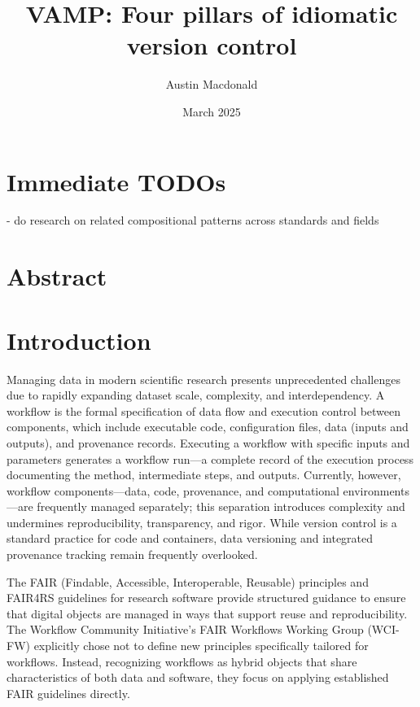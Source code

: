 \documentclass{article}
\title{VAMP: Four pillars of idiomatic version control}
\author{Austin Macdonald}
\date{March 2025}
\begin{document}
\maketitle

\section{Immediate TODOs}

- do research on related compositional patterns across standards and fields

\section{Abstract}


\section{Introduction}

Managing data in modern scientific research presents unprecedented challenges due to rapidly expanding dataset scale, complexity, and interdependency.
A workflow is the formal specification of data flow and execution control between components, which include executable code, configuration files, data (inputs and outputs), and provenance records.
Executing a workflow with specific inputs and parameters generates a workflow run—a complete record of the execution process documenting the method, intermediate steps, and outputs.
Currently, however, workflow components—data, code, provenance, and computational environments—are frequently managed separately; this separation introduces complexity and undermines reproducibility, transparency, and rigor.
While version control is a standard practice for code and containers, data versioning and integrated provenance tracking remain frequently overlooked.

The FAIR (Findable, Accessible, Interoperable, Reusable) principles and FAIR4RS guidelines for research software provide structured guidance to ensure that digital objects are managed in ways that support reuse and reproducibility.
The Workflow Community Initiative’s FAIR Workflows Working Group (WCI-FW) explicitly chose not to define new principles specifically tailored for workflows.
Instead, recognizing workflows as hybrid objects that share characteristics of both data and software, they focus on applying established FAIR guidelines directly.
\end{document}
